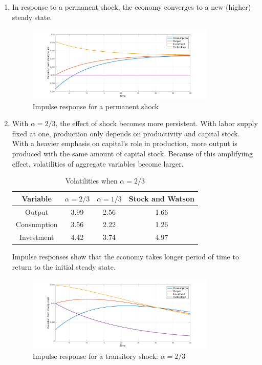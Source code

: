\documentclass[11pt]{amsart}
\begin{document}
\begin{enumerate}[label = (\alph*)]
    \item In response to a permanent shock, the economy converges to a new (higher) steady state. 
    \begin{figure}[H]
    	\centering
    	\includegraphics[width=0.85\textwidth]{5c_Minki.png}
    	\caption{Impulse response for a permanent shock}
    \end{figure}

    \item With $\alpha = 2/3$, the effect of shock becomes more persistent. With labor supply fixed at one, production only depends on productivity and capital stock. With a heavier emphasis on capital's role in production, more output is produced with the same amount of capital stock. Because of this amplifyiing effect, volatilities of aggregate variables become larger.  
    \begin{table}[H]
    	\centering
    	\begin{tabular}{cccc}
    		\hline \hline 
    		\bf Variable  &$\alpha = 2/3$ & \bf$\alpha=1/3$          & \bf Stock and Watson \\
    		\hline 
    		Output            &   3.99  &  2.56       &   1.66      \\
    		Consumption  &   3.56  &   2.22      &   1.26         \\
    		Investment      &   4.42  &   3.74      &    4.97       \\
    		\hline
    	\end{tabular}
    	\caption{Volatilities when $\alpha = 2/3$}
    \end{table}
    Impulse responses show that the economy takes longer period of time to return to the initial steady state. 
    \begin{figure}[H]
    	\centering
    	\includegraphics[width=0.85\textwidth]{5d_Minki.png}
    	\caption{Impulse response for a transitory shock: $\alpha = 2/3$}
    \end{figure}
\end{enumerate}
\end{document}
